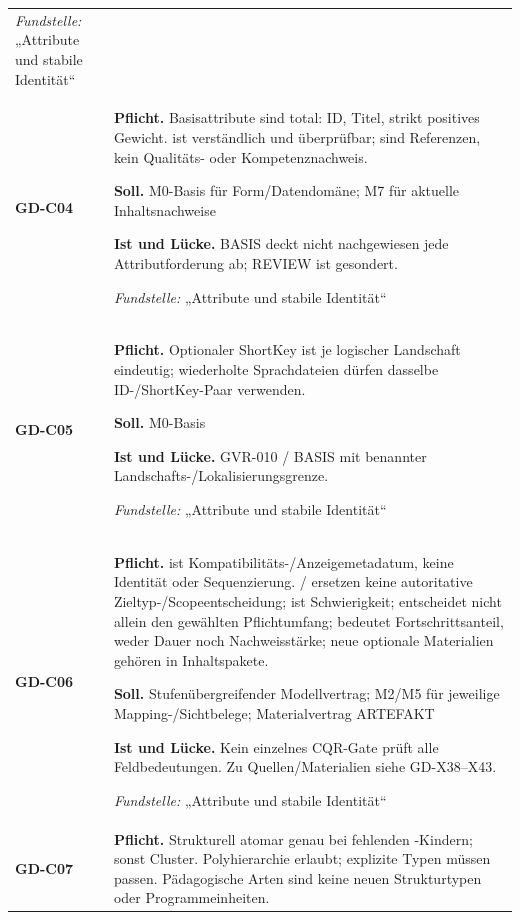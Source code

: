 \begin{longtable}{@{}P{20mm}P{128mm}@{}}
\emph{Fundstelle:} „Attribute und stabile Identität“\\\addlinespace[5pt]
\label{rule:GD-C04}\textbf{GD-C04} &
\textbf{Pflicht.} Basisattribute sind total: ID, Titel, strikt positives Gewicht.  ist verständlich und überprüfbar;  sind Referenzen, kein Qualitäts- oder Kompetenznachweis.\par\smallskip
\textbf{Soll.} M0-Basis für Form/Datendomäne; M7 für aktuelle Inhaltsnachweise\par\smallskip
\textbf{Ist und Lücke.} BASIS deckt nicht nachgewiesen jede Attributforderung ab; REVIEW ist gesondert.\par\smallskip
\emph{Fundstelle:} „Attribute und stabile Identität“\\\addlinespace[5pt]
\label{rule:GD-C05}\textbf{GD-C05} &
\textbf{Pflicht.} Optionaler ShortKey ist je logischer Landschaft eindeutig; wiederholte Sprachdateien dürfen dasselbe ID-/ShortKey-Paar verwenden.\par\smallskip
\textbf{Soll.} M0-Basis\par\smallskip
\textbf{Ist und Lücke.} GVR-010 / BASIS mit benannter Landschafts-/Lokalisierungsgrenze.\par\smallskip
\emph{Fundstelle:} „Attribute und stabile Identität“\\\addlinespace[5pt]
\label{rule:GD-C06}\textbf{GD-C06} &
\textbf{Pflicht.}  ist Kompatibilitäts-/Anzeigemetadatum, keine Identität oder Sequenzierung. / ersetzen keine autoritative Zieltyp-/Scopeentscheidung;  ist Schwierigkeit;  entscheidet nicht allein den gewählten Pflichtumfang;  bedeutet Fortschrittsanteil, weder Dauer noch Nachweisstärke; neue optionale Materialien gehören in Inhaltspakete.\par\smallskip
\textbf{Soll.} Stufenübergreifender Modellvertrag; M2/M5 für jeweilige Mapping-/Sichtbelege; Materialvertrag ARTEFAKT\par\smallskip
\textbf{Ist und Lücke.} Kein einzelnes CQR-Gate prüft alle Feldbedeutungen. Zu Quellen/Materialien siehe GD-X38–X43.\par\smallskip
\emph{Fundstelle:} „Attribute und stabile Identität“\\\addlinespace[5pt]
\label{rule:GD-C07}\textbf{GD-C07} &
\textbf{Pflicht.} Strukturell atomar genau bei fehlenden -Kindern; sonst Cluster. Polyhierarchie erlaubt; explizite Typen müssen passen. Pädagogische Arten sind keine neuen Strukturtypen oder Programmeinheiten.\par\smallskip

\end{longtable}
